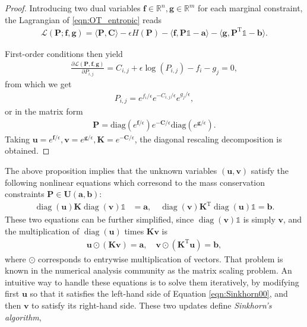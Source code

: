 \documentclass[11pt]{book}
\begin{document}
\begin{proof}
Introducing two dual variables $\mathbf{f} \in \mathbb{R}^n, \mathbf{g} \in \mathbb{R}^m$ for each marginal constraint, the Lagrangian of \eqref{eqn:OT_entropic} reads
\begin{align*}
    \mathcal{L}(\mathbf{P}; \mathbf{f}, \mathbf{g}) = \langle \mathbf{P}, \mathbf{C} \rangle - \epsilon H(\mathbf{P}) - \langle \mathbf{f}, \mathbf{P} \mathbb{1} - \mathbf{a} \rangle - \langle \mathbf{g}, \mathbf{P}^{\mathrm{T}} \mathbb{1} - \mathbf{b} \rangle.
\end{align*}

First-order conditions then yield
\begin{align*}
    \frac{\partial \mathcal{L}(\mathbf{P}, \mathbf{f}, \mathbf{g})}{\partial P_{i,j}} = C_{i,j} + \epsilon \log (P_{i,j}) - f_i - g_j = 0,
\end{align*}
from which we get
\begin{align*}
    P_{i,j} = e^{f_i/\epsilon} e^{-C_{i,j}/\epsilon} e^{g_j/\epsilon},
\end{align*}
or in the matrix form
\begin{align*}
    \mathbf{P} = \text{diag}(e^{\mathbf{f}/\epsilon}) e^{-\mathbf{C}/\epsilon} \text{diag}(e^{\mathbf{g}/\epsilon}).
\end{align*}
Taking $\mathbf{u} = e^{\mathbf{f}/\epsilon}, \mathbf{v} = e^{\mathbf{g}/\epsilon}, \mathbf{K} = e^{-\mathbf{C}/\epsilon}$, the diagonal rescaling decomposition is obtained.
\end{proof}

The above proposition implies that the unknown variables $(\mathbf{u},\mathbf{v})$ satisfy the following nonlinear equations which corresond to the mass conservation constraints $\mathbf{P} \in \mathbf{U}(\mathbf{a},\mathbf{b})$:
\begin{align*}
    \operatorname{diag}(\mathbf{u}) \mathbf{K} \operatorname{diag}(\mathbf{v}) \mathbb{1} &= \mathbf{a}, 
    \quad \operatorname{diag}(\mathbf{v}) \mathbf{K}^{\mathrm{T}} \operatorname{diag}(\mathbf{u}) \mathbb{1} = \mathbf{b}.
\end{align*}
These two equations can be further simplified, since $\operatorname{diag}(\mathbf{v}) \mathbb{1}$ is simply $\mathbf{v}$, and the multiplication of $\operatorname{diag}(\mathbf{u})$ times $\mathbf{K} \mathbf{v}$ is  
\begin{align}\label{eqn:Sinkhorn00}
    \mathbf{u} \odot (\mathbf{K} \mathbf{v}) = \mathbf{a},  
    \quad \mathbf{v} \odot (\mathbf{K}^{\mathrm{T}} \mathbf{u}) = \mathbf{b},
\end{align}
where $\odot$ corresponds to entrywise multiplication of vectors. That problem is known in the numerical analysis community as the matrix scaling problem. An intuitive way to handle these equations is to solve them iteratively, by modifying first $\mathbf{u}$ so that it satisfies the left-hand side of Equation \eqref{eqn:Sinkhorn00}, and then $\mathbf{v}$ to satisfy its right-hand side. These two updates define {\it Sinkhorn’s algorithm},
\end{document}
